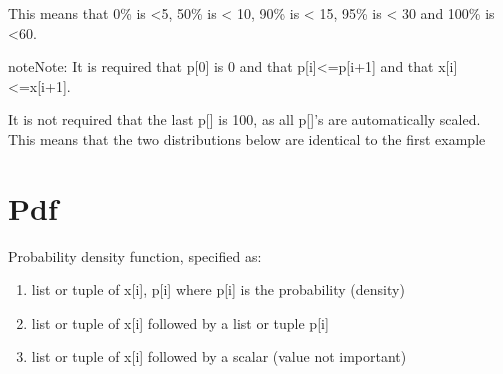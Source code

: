 \documentclass[letterpaper,10pt,english]{sphinxmanual}
\begin{document}
\begin{sphinxVerbatim}[commandchars=\\\{\}]
           
\end{sphinxVerbatim}

This means that 0\% is \textless{}5, 50\% is \textless{} 10, 90\% is \textless{} 15, 95\% is \textless{} 30 and 100\% is \textless{}60.

\begin{sphinxadmonition}{note}{Note:}
It is required that p{[}0{]} is 0 and that p{[}i{]}\textless{}=p{[}i+1{]} and that x{[}i{]}\textless{}=x{[}i+1{]}.
\end{sphinxadmonition}

It is not required that the last p{[}{]} is 100, as all p{[}{]}’s are automatically scaled. This means that the two distributions below are
identical to the first example

\begin{sphinxVerbatim}[commandchars=\\\{\}]
           
                      
\end{sphinxVerbatim}


\section{Pdf}
\label{\detokenize{Distributions:pdf}}
Probability density function, specified as:
\begin{enumerate}
\item {} 
list or tuple of x{[}i{]}, p{[}i{]} where p{[}i{]} is the probability (density)

\item {} 
list or tuple of x{[}i{]} followed by a list or tuple p{[}i{]}

\item {} 
list or tuple of x{[}i{]} followed by a scalar (value not important)

\end{enumerate}
\end{document}
